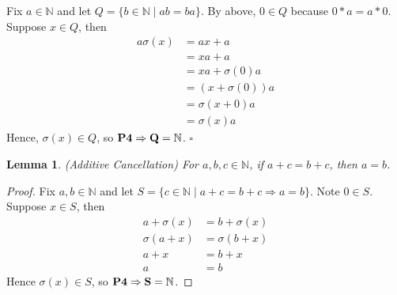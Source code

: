 \documentclass{article}
\newcommand{\N}{\mathbb{N}}
\newtheorem*{lemma}{Lemma}
\begin{document}
\begin{enumerate}[label=\textbf{(\alph*)}]
{      Fix $a\in\N$ and let $Q=\{b\in\N\mid ab=ba\}$. By above, $0\in Q$ because
      $0*a=a*0$. Suppose $x\in Q$, then
      \begin{align*}
        a\sigma(x)  &= ax+a           \tag{4}     \\
                    &= xa+a           \tag{IH}    \\
                    &= xa+\sigma(0)a  \tag{above} \\
                    &= (x+\sigma(0))a \tag{e}     \\
                    &= \sigma(x+0)a   \tag{2}     \\
                    &= \sigma(x)a     \tag{1}
      \end{align*}
      Hence, $\sigma(x) \in Q$, so $\bf{P4}\Rightarrow Q=\N$.
      \hfill $\square$
    }
  \end{enumerate}

\hfill\break
\begin{lemma}{(Additive Cancellation)}
  For $a,b,c \in \N$, if $a+c=b+c$, then $a=b$.
\end{lemma}
\begin{proof}
  Fix $a,b\in\N$ and let $S=\{c\in\N\mid a+c=b+c\Rightarrow a=b\}$. Note $0\in
  S$. Suppose $x\in S$, then
  \begin{align*}
    a+\sigma(x) &= b+\sigma(x)          \\
    \sigma(a+x) &= \sigma(b+x) \tag{2}  \\
            a+x &= b+x         \tag{P3} \\
              a &= b           \tag{IH}
  \end{align*}
  Hence $\sigma(x) \in S$, so $\bf{P4}\Rightarrow S=\N$.
\end{proof}
\end{document}
